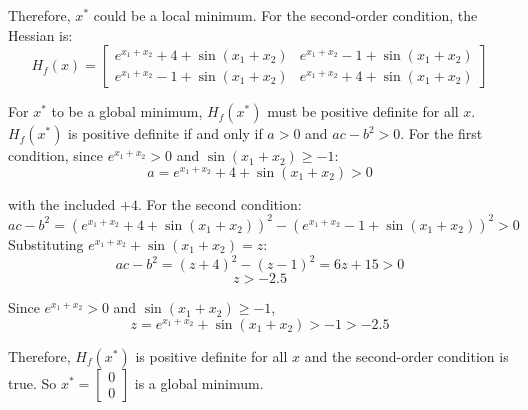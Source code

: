 \begin{homeworkProblem}
\begin{solution}[Proof]
        Therefore, $x^*$ could be a local minimum. For the second-order 
        condition, the Hessian is:
        \[
            H_f(x) = \left[ \begin{array}{cc}
                e^{x_1 + x_2} + 4 + \sin(x_1 + x_2) & e^{x_1 + x_2} - 1 + \sin(x_1 + x_2) \\
                e^{x_1 + x_2} - 1 + \sin(x_1 + x_2) & e^{x_1 + x_2} + 4 + \sin(x_1 + x_2)
            \end{array} \right]
        \]

        For $x^*$ to be a global minimum, $H_f(x^*)$ must be positive definite
        for all $x$. $H_f(x^*)$ is positive definite if and only if $a > 0$ 
        and $ac - b^2 > 0$. For the first condition, since $e^{x_1 + x_2} > 0$
        and $\sin(x_1 + x_2) \geq -1$:
        \[    
            a = e^{x_1 + x_2} + 4 + \sin(x_1 + x_2) > 0 
        \]

        with the included $+4$. For the second condition:
        \[
            ac - b^2 = (e^{x_1 + x_2} + 4 + \sin(x_1 + x_2))^2 - 
            (e^{x_1 + x_2} - 1 + \sin(x_1 + x_2))^2 > 0
        \]
        Substituting $e^{x_1 + x_2} + \sin(x_1 + x_2) = z$:
        \[
            ac - b^2 = (z + 4)^2 - (z - 1)^2 = 6z + 15 > 0
        \]
        \[
            z > -2.5
        \]

        Since $e^{x_1 + x_2} > 0$ and $\sin(x_1 + x_2) \geq -1$,
        \[
            z = e^{x_1 + x_2} + \sin(x_1 + x_2) > -1 > -2.5
        \]

        Therefore, \(H_f(x^*)\) is positive definite for all \(x\) and the 
        second-order condition is true. So \(x^* = \left[ \begin{array}{c} 0 \\ 
        0 \end{array} \right]\) is a global minimum.

    \end{solution}

\end{homeworkProblem}